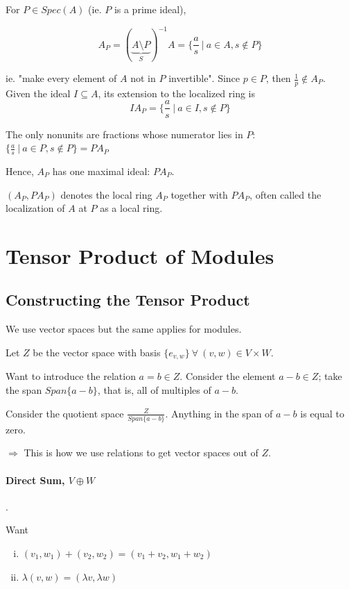 \documentclass{article}
\theoremstyle{definition}
\begin{document}
For $P \in Spec(A)$ (ie. $P$ is a prime ideal),

$$A_P = ( \underbrace{A \setminus P}_{S} )^{-1} A = \{ \frac{a}{s} ~|~ a \in A, s \not\in P \}$$

ie. "make every element of $A$ not in $P$ invertible". Since $p \in P$, then $\frac{1}{p} \not\in A_P$.\\

Given the ideal $I \subseteq A$, its extension to the localized ring is
$$I A_P = \{ \frac{a}{s} ~|~ a \in I, s \not\in P \}$$

\vspace{0.6cm}

The only nonunits are fractions whose numerator lies in $P$: $\{ \frac{a}{s} ~|~ a \in P, s \not\in P \} = P A_P$

Hence, $A_P$ has one maximal ideal: $P A_P$.

$(A_P, P A_P)$ denotes the local ring $A_P$ together with $P A_P$, often called the localization of $A$ at $P$ as a local ring.

\vspace{1.0cm}



\section{Tensor Product of Modules}

\subsection{Constructing the Tensor Product}
We use vector spaces but the same applies for modules.

Let $Z$ be the vector space with basis $\{ e_{v,w} \} ~\forall~ (v,w) \in V \times W$.

Want to introduce the relation $a = b \in Z$. Consider the element $a-b \in Z$; take the span $Span\{a-b\}$, that is, all of multiples of $a-b$.

Consider the quotient space $\frac{Z}{Span\{a-b\}}$.
Anything in the span of $a-b$ is equal to zero.

$\Longrightarrow$ This is how we use relations to get vector spaces out of $Z$.

\paragraph{Direct Sum, $V \oplus W$}.

Want
\begin{enumerate}[i.]
  \item $(v_1, w_1) + (v_2, w_2) = (v_1 + v_2, w_1 + w_2)$
  \item $\lambda (v, w) = (\lambda v, \lambda w)$
\end{enumerate}
\end{document}
